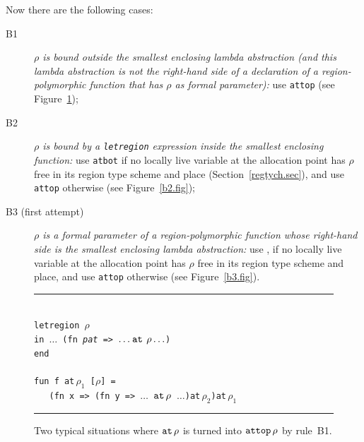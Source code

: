 \documentclass[12pt]{book}
\begin{document}
Now there are the following cases:
\begin{description}
\item[B1] {\it $\rho$ is bound outside the smallest enclosing lambda abstraction
      (and this lambda abstraction is not the right-hand side of a 
      declaration of a region-polymorphic function that has $\rho$ as
      formal parameter):}
      use {\tt attop} (see Figure~\ref{b1.fig});
\item[B2]{\it $\rho$ is bound by a {\tt letregion} expression inside the
      smallest enclosing function:} use {\tt atbot} if no locally live
      variable at the allocation point has $\rho$ free in its region 
      type scheme and place (Section~\ref{regtych.sec}), and use {\tt attop} otherwise 
      (see Figure~\ref{b2.fig});
    \item[B3 (first attempt)]{\it $\rho$ is a formal parameter of a
        region-polymorphic function whose right-hand side is the
        smallest enclosing lambda abstraction:} use , if no locally live variable at the
      allocation point has $\rho$ free in its region type scheme and place, and
      use {\tt attop} otherwise (see Figure~\ref{b3.fig}).
\end{description}
\begin{figure}
\hrule
\begin{center}
\begin{tabbing}
\\
\hskip3cm\=\tt letregion $\rho$\\
       \>\tt in $\ldots$ (fn {\it pat} => $\ldots\mathbin{\hbox{\tt at}}\,\rho\ldots$)\\
       \>\tt end\\
\\
       \>\tt fun f at$\,\rho_1$ [$\rho$] =\\
       \>\tt\ \ \ (fn x => (fn y => $\ldots$ $\mathbin{\hbox{\tt at}}\,\rho$ $\ldots$)at$\,\rho_2$)at$\,\rho_1$\\
\end{tabbing}
\end{center}
\caption{Two typical situations where $\mathbin{\hbox{\tt at}}\,\rho$ is turned into $\hbox{\tt attop}\,\rho$
by rule~B1.}
\medskip
\hrule
\label{b1.fig}
\end{figure}
\end{document}
